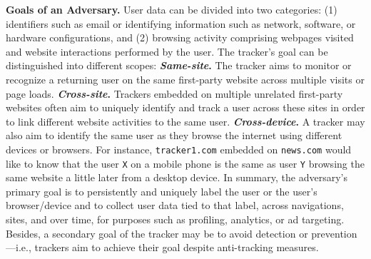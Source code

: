 \noindent \textbf{Goals of an Adversary.} 
%
%
User data can be divided into two categories: (1) identifiers such as email or identifying information such as network, software, or hardware configurations, and (2) browsing activity comprising webpages visited and website interactions performed by the user. 
%
The tracker's goal can be distinguished into different scopes:
%
\noindent \textbf{\textit{Same-site}.} 
The tracker aims to monitor or recognize a returning user on the same first-party website across multiple visits or page loads. 
%
\textbf{\textit{Cross-site}.} 
%
Trackers embedded on multiple unrelated first-party websites often aim to uniquely identify and track a user across these sites in order to link different website activities to the same user.
%
\textbf{\textit{Cross-device}.} 
%
A tracker may also aim to identify the same user as they browse the internet using different devices or browsers. 
%
For instance, \texttt{tracker1.com} embedded on \texttt{news.com} would like to know that the user \texttt{X} on a mobile phone is the same as user \texttt{Y} browsing the same website a little later from a desktop device.
%
In summary, the adversary's primary goal is to persistently and uniquely label the user or the user’s browser/device and to collect user data tied to that label, across navigations, sites, and over time, for purposes such as profiling, analytics, or ad targeting.
%
Besides, a secondary goal of the tracker may be to avoid detection or prevention---i.e., trackers aim to achieve their goal despite anti-tracking measures.



